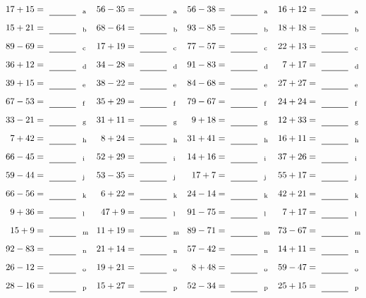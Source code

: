 \documentclass
[
  draft    = true,
  fontsize = 11pt,
  parskip  = half-
]
{scrartcl}
\begin{document}
\clearpage
\begin{align*}
    \pline{17+15}&=\rline{a}
  & \pline{56-35}&=\rline{a}
  & \pline{56-38}&=\rline{a}
  & \pline{16+12}&=\rline{a} \\[1ex]
    \pline{15+21}&=\rline{b}
  & \pline{68-64}&=\rline{b}
  & \pline{93-85}&=\rline{b}
  & \pline{18+18}&=\rline{b} \\[1ex]
    \pline{89-69}&=\rline{c}
  & \pline{17+19}&=\rline{c}
  & \pline{77-57}&=\rline{c}
  & \pline{22+13}&=\rline{c} \\[1ex]
    \pline{36+12}&=\rline{d}
  & \pline{34-28}&=\rline{d}
  & \pline{91-83}&=\rline{d}
  & \pline{7+17}&=\rline{d} \\[1ex]
    \pline{39+15}&=\rline{e}
  & \pline{38-22}&=\rline{e}
  & \pline{84-68}&=\rline{e}
  & \pline{27+27}&=\rline{e} \\[1ex]
    \pline{67-53}&=\rline{f}
  & \pline{35+29}&=\rline{f}
  & \pline{79-67}&=\rline{f}
  & \pline{24+24}&=\rline{f} \\[1ex]
    \pline{33-21}&=\rline{g}
  & \pline{31+11}&=\rline{g}
  & \pline{9+18}&=\rline{g}
  & \pline{12+33}&=\rline{g} \\[1ex]
    \pline{7+42}&=\rline{h}
  & \pline{8+24}&=\rline{h}
  & \pline{31+41}&=\rline{h}
  & \pline{16+11}&=\rline{h} \\[1ex]
    \pline{66-45}&=\rline{i}
  & \pline{52+29}&=\rline{i}
  & \pline{14+16}&=\rline{i}
  & \pline{37+26}&=\rline{i} \\[1ex]
    \pline{59-44}&=\rline{j}
  & \pline{53-35}&=\rline{j}
  & \pline{17+7}&=\rline{j}
  & \pline{55+17}&=\rline{j} \\[1ex]
    \pline{66-56}&=\rline{k}
  & \pline{6+22}&=\rline{k}
  & \pline{24-14}&=\rline{k}
  & \pline{42+21}&=\rline{k} \\[1ex]
    \pline{9+36}&=\rline{l}
  & \pline{47+9}&=\rline{l}
  & \pline{91-75}&=\rline{l}
  & \pline{7+17}&=\rline{l} \\[1ex]
    \pline{15+9}&=\rline{m}
  & \pline{11+19}&=\rline{m}
  & \pline{89-71}&=\rline{m}
  & \pline{73-67}&=\rline{m} \\[1ex]
    \pline{92-83}&=\rline{n}
  & \pline{21+14}&=\rline{n}
  & \pline{57-42}&=\rline{n}
  & \pline{14+11}&=\rline{n} \\[1ex]
    \pline{26-12}&=\rline{o}
  & \pline{19+21}&=\rline{o}
  & \pline{8+48}&=\rline{o}
  & \pline{59-47}&=\rline{o} \\[1ex]
    \pline{28-16}&=\rline{p}
  & \pline{15+27}&=\rline{p}
  & \pline{52-34}&=\rline{p}
  & \pline{25+15}&=\rline{p}
\end{align*}
\end{document}
